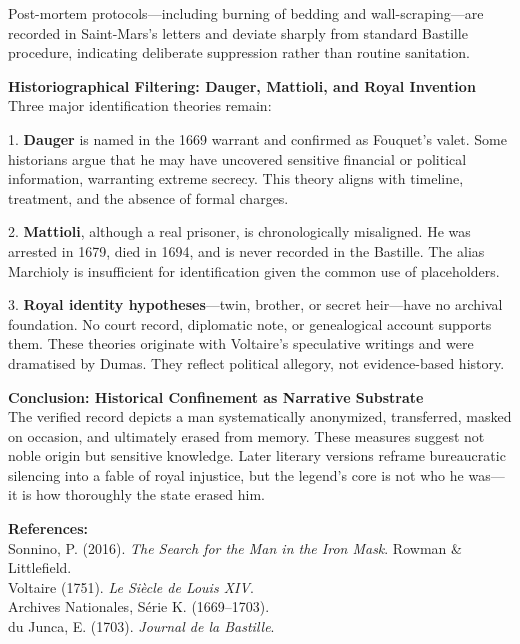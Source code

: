 \begin{technical}
    Post-mortem protocols—including burning of bedding and wall-scraping—are recorded in Saint-Mars’s letters and deviate sharply from standard Bastille procedure, indicating deliberate suppression rather than routine sanitation.
    
    \textbf{Historiographical Filtering: Dauger, Mattioli, and Royal Invention}\\[0.5em]
    Three major identification theories remain:
    
    1. \textbf{Dauger} is named in the 1669 warrant and confirmed as Fouquet’s valet. Some historians argue that he may have uncovered sensitive financial or political information, warranting extreme secrecy. This theory aligns with timeline, treatment, and the absence of formal charges.
    
    2. \textbf{Mattioli}, although a real prisoner, is chronologically misaligned. He was arrested in 1679, died in 1694, and is never recorded in the Bastille. The alias \QSOpen{}Marchioly\QSClose{} is insufficient for identification given the common use of placeholders.
    
    3. \textbf{Royal identity hypotheses}—twin, brother, or secret heir—have no archival foundation. No court record, diplomatic note, or genealogical account supports them. These theories originate with Voltaire’s speculative writings and were dramatised by Dumas. They reflect political allegory, not evidence-based history.
    
    \textbf{Conclusion: Historical Confinement as Narrative Substrate}\\[0.5em]
    The verified record depicts a man systematically anonymized, transferred, masked on occasion, and ultimately erased from memory. These measures suggest not noble origin but sensitive knowledge. Later literary versions reframe bureaucratic silencing into a fable of royal injustice, but the legend’s core is not who he was—it is how thoroughly the state erased him.
    
    \vspace{0.5em}
    \textbf{References:}\\
    Sonnino, P. (2016). \textit{The Search for the Man in the Iron Mask}. Rowman \& Littlefield.\\
    Voltaire (1751). \textit{Le Siècle de Louis XIV}.\\
    Archives Nationales, Série K. (1669–1703).\\
    du Junca, E. (1703). \textit{Journal de la Bastille}.
    \end{technical}
    